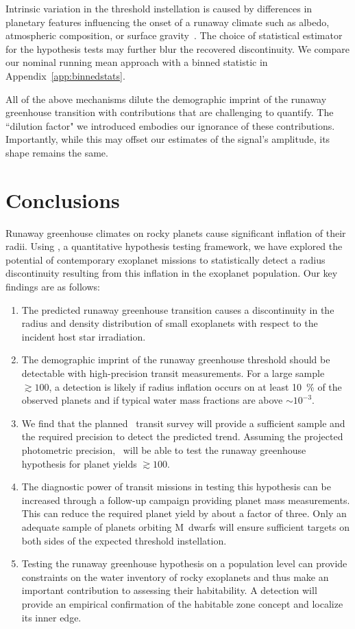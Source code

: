 \documentclass[twocolumn,twocolappendix]{aastex631}
\begin{document}
Intrinsic variation in the threshold instellation is caused by differences in planetary features influencing the onset of a runaway climate such as albedo, atmospheric composition, or surface gravity~\citep{Pierrehumbert2022}.
The choice of statistical estimator for the hypothesis tests may further blur the recovered discontinuity.
We compare our nominal running mean approach with a binned statistic in Appendix~\ref{app:binnedstats}.

All of the above mechanisms dilute the demographic imprint of the runaway greenhouse transition with contributions that are challenging to quantify.
The ``dilution factor" we introduced embodies our ignorance of these contributions.
Importantly, while this may offset our estimates of the signal's amplitude, its shape remains the same.



\section{Conclusions}
Runaway greenhouse climates on rocky planets cause significant inflation of their radii.
Using \bioverse, a quantitative hypothesis testing framework, we have explored the potential of contemporary exoplanet missions to statistically detect a radius discontinuity resulting from this inflation in the exoplanet population.
Our key findings are as follows:
\begin{enumerate}
    \item The predicted runaway greenhouse transition causes a discontinuity in the radius and density distribution of small exoplanets with respect to the incident host star irradiation.
    \item The demographic imprint of the runaway greenhouse threshold should be detectable with high-precision transit measurements. For a large sample $\gtrsim 100$, a detection is likely if radius inflation occurs on at least \SI{10}{\percent} of the observed planets and if typical water mass fractions are above $\sim 10^{-3}$.
    \item We find that the planned \plato\ transit survey will provide a sufficient sample and the required precision to detect the predicted trend. Assuming the projected photometric precision, \plato\ will be able to test the runaway greenhouse hypothesis for planet yields $\gtrsim 100$.
    \item The diagnostic power of transit missions in testing this hypothesis can be increased through a follow-up campaign providing planet mass measurements.
          This can reduce the required planet yield by about a factor of three.
          Only an adequate sample of planets orbiting M~dwarfs will ensure sufficient targets on both sides of the expected threshold instellation.
    \item Testing the runaway greenhouse hypothesis on a population level can provide constraints on the water inventory of rocky exoplanets and thus make an important contribution to assessing their habitability.
         A detection will provide an empirical confirmation of the habitable zone concept and localize its inner edge.

\end{enumerate}
\end{document}

